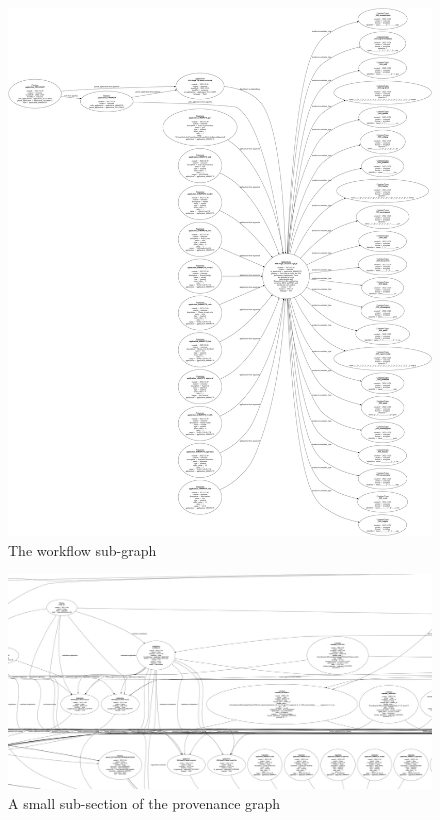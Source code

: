 \documentclass[runningheads]{llncs}
\begin{document}
\begin{figure} %
\includegraphics[width=\textwidth]{img/workflow.pdf}
\caption{The workflow sub-graph} \label{fig:workflow} \end{figure}

\begin{figure}
\includegraphics[width=\textwidth]{img/subsection-of-provenance.png}
\caption{A small sub-section of the provenance graph} \label{fig:sub-provenance}
\end{figure}
\end{document}
